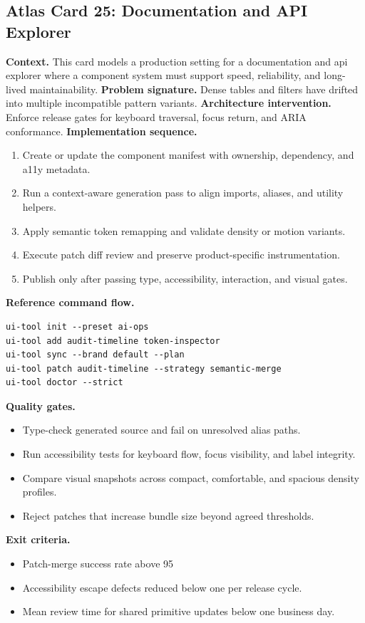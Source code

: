 \subsection*{Atlas Card 25: Documentation and API Explorer}
\textbf{Context.} This card models a production setting for a documentation and api explorer where a component system must support speed, reliability, and long-lived maintainability.
\textbf{Problem signature.} Dense tables and filters have drifted into multiple incompatible pattern variants.
\textbf{Architecture intervention.} Enforce release gates for keyboard traversal, focus return, and ARIA conformance.
\textbf{Implementation sequence.}
\begin{enumerate}[leftmargin=*, itemsep=0.28em]
  \item Create or update the component manifest with ownership, dependency, and a11y metadata.
  \item Run a context-aware generation pass to align imports, aliases, and utility helpers.
  \item Apply semantic token remapping and validate density or motion variants.
  \item Execute patch diff review and preserve product-specific instrumentation.
  \item Publish only after passing type, accessibility, interaction, and visual gates.
\end{enumerate}
\textbf{Reference command flow.}
\begin{verbatim}
ui-tool init --preset ai-ops
ui-tool add audit-timeline token-inspector
ui-tool sync --brand default --plan
ui-tool patch audit-timeline --strategy semantic-merge
ui-tool doctor --strict
\end{verbatim}
\textbf{Quality gates.}
\begin{itemize}[leftmargin=*, itemsep=0.24em]
  \item Type-check generated source and fail on unresolved alias paths.
  \item Run accessibility tests for keyboard flow, focus visibility, and label integrity.
  \item Compare visual snapshots across compact, comfortable, and spacious density profiles.
  \item Reject patches that increase bundle size beyond agreed thresholds.
\end{itemize}
\textbf{Exit criteria.}
\begin{itemize}[leftmargin=*, itemsep=0.24em]
  \item Patch-merge success rate above 95%
  \item Accessibility escape defects reduced below one per release cycle.
  \item Mean review time for shared primitive updates below one business day.
\end{itemize}
\clearpage
